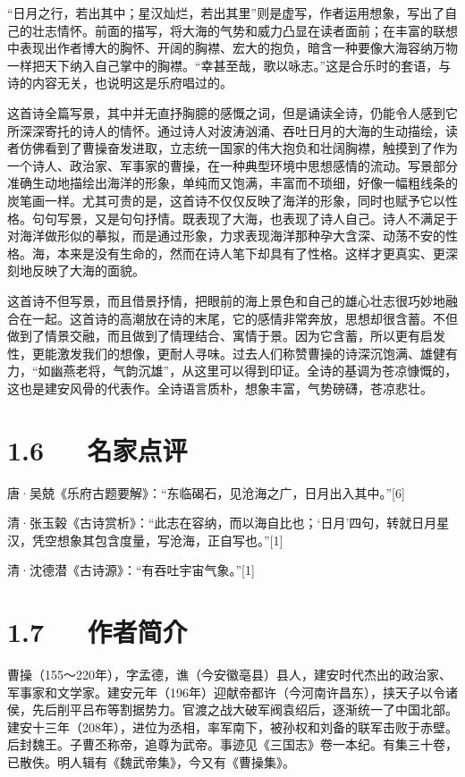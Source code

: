 \documentclass[letterpaper,10pt,english]{sphinxmanual}
\begin{document}
“日月之行，若出其中；星汉灿烂，若出其里”则是虚写，作者运用想象，写出了自己的壮志情怀。前面的描写，将大海的气势和威力凸显在读者面前；在丰富的联想中表现出作者博大的胸怀、开阔的胸襟、宏大的抱负，暗含一种要像大海容纳万物一样把天下纳入自己掌中的胸襟。“幸甚至哉，歌以咏志。”这是合乐时的套语，与诗的内容无关，也说明这是乐府唱过的。

这首诗全篇写景，其中并无直抒胸臆的感慨之词，但是诵读全诗，仍能令人感到它所深深寄托的诗人的情怀。通过诗人对波涛汹涌、吞吐日月的大海的生动描绘，读者仿佛看到了曹操奋发进取，立志统一国家的伟大抱负和壮阔胸襟，触摸到了作为一个诗人、政治家、军事家的曹操，在一种典型环境中思想感情的流动。写景部分准确生动地描绘出海洋的形象，单纯而又饱满，丰富而不琐细，好像一幅粗线条的炭笔画一样。尤其可贵的是，这首诗不仅仅反映了海洋的形象，同时也赋予它以性格。句句写景，又是句句抒情。既表现了大海，也表现了诗人自己。诗人不满足于对海洋做形似的摹拟，而是通过形象，力求表现海洋那种孕大含深、动荡不安的性格。海，本来是没有生命的，然而在诗人笔下却具有了性格。这样才更真实、更深刻地反映了大海的面貌。

这首诗不但写景，而且借景抒情，把眼前的海上景色和自己的雄心壮志很巧妙地融合在一起。这首诗的高潮放在诗的末尾，它的感情非常奔放，思想却很含蓄。不但做到了情景交融，而且做到了情理结合、寓情于景。因为它含蓄，所以更有启发性，更能激发我们的想像，更耐人寻味。过去人们称赞曹操的诗深沉饱满、雄健有力，“如幽燕老将，气韵沉雄”，从这里可以得到印证。全诗的基调为苍凉慷慨的，这也是建安风骨的代表作。全诗语言质朴，想象丰富，气势磅礴，苍凉悲壮。


\section{1.6   名家点评}
\label{\detokenize{p01_u6563_u6587/_u66f9_u64cd-_u89c2_u6ca7_u6d77:id8}}
唐·吴兢《乐府古题要解》：“东临碣石，见沧海之广，日月出入其中。”{[}6{]}

清·张玉榖《古诗赏析》：“此志在容纳，而以海自比也；‘日月’四句，转就日月星汉，凭空想象其包含度量，写沧海，正自写也。”{[}1{]}

清·沈德潜《古诗源》：“有吞吐宇宙气象。”{[}1{]}


\section{1.7   作者简介}
\label{\detokenize{p01_u6563_u6587/_u66f9_u64cd-_u89c2_u6ca7_u6d77:id9}}
曹操（155～220年），字孟德，谯（今安徽亳县）县人，建安时代杰出的政治家、军事家和文学家。建安元年（196年）迎献帝都许（今河南许昌东），挟天子以令诸侯，先后削平吕布等割据势力。官渡之战大破军阀袁绍后，逐渐统一了中国北部。建安十三年（208年），进位为丞相，率军南下，被孙权和刘备的联军击败于赤壁。后封魏王。子曹丕称帝，追尊为武帝。事迹见《三国志》卷一本纪。有集三十卷，已散佚。明人辑有《魏武帝集》，今又有《曹操集》。
\end{document}
